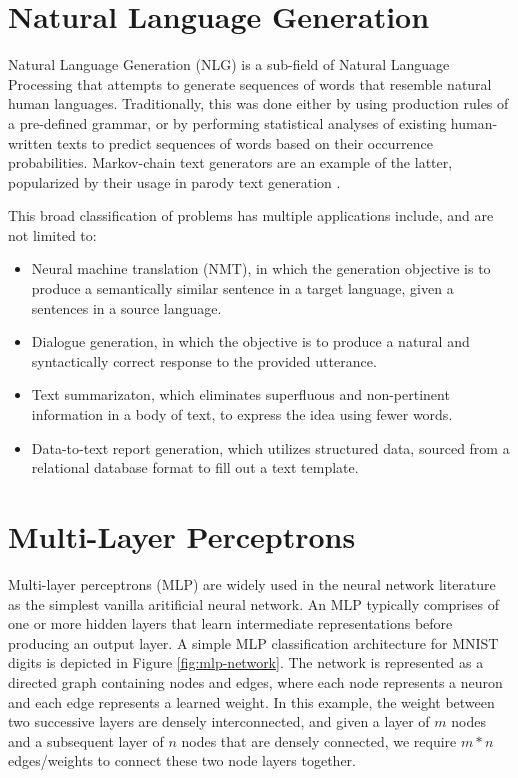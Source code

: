 \section{Natural Language Generation}

Natural Language Generation (NLG) is a sub-field of Natural Language Processing that attempts to generate sequences of words that resemble natural human languages. Traditionally, this was done either by using production rules of a pre-defined grammar, or by performing statistical analyses of existing human-written texts to predict sequences of words based on their occurrence probabilities. Markov-chain text generators are an example of the latter, popularized by their usage in parody text generation \cite{jelinek1985markov}.

This broad classification of problems has multiple applications include, and are not limited to:
\begin{itemize}
	\item Neural machine translation (NMT), in which the generation objective is to produce a semantically similar sentence in a target language, given a sentences in a source language.
	\item Dialogue generation, in which the objective is to produce a natural and syntactically correct response to the provided utterance.
	\item Text summarizaton, which eliminates superfluous and non-pertinent information in a body of text, to express the idea using fewer words.
	\item Data-to-text report generation, which utilizes structured data, sourced from a relational database format to fill out a text template.
\end{itemize}


\section{Multi-Layer Perceptrons}

Multi-layer perceptrons (MLP) are widely used in the neural network literature as the simplest vanilla aritificial neural network. An MLP typically comprises of one or more hidden layers that learn intermediate representations before producing an output layer. A simple MLP classification architecture for MNIST digits \citep{lecun2010mnist} \citep{deng2012mnist} is depicted in Figure \ref{fig:mlp-network}. The network is represented as a directed graph containing nodes and edges, where each node represents a neuron and each edge represents a learned weight. In this example, the weight between two successive layers are densely interconnected, and given a layer of $m$ nodes and a subsequent layer of $n$ nodes that are densely connected, we require $m*n$ edges/weights to connect these two node layers together.

